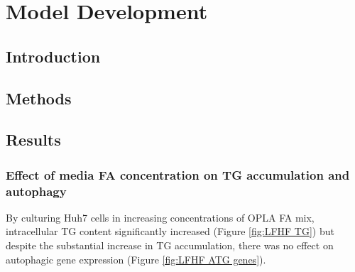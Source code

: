 \chapter{\label{ch:3-Model Development}Model Development}

\minitoc

 \section{Introduction}

 \section{Methods}

 \section{Results}

\subsection{Effect of media FA concentration on TG accumulation and autophagy}

By culturing Huh7 cells in increasing concentrations of OPLA FA mix, intracellular TG content significantly increased (Figure \ref{fig:LFHF TG}) but despite the substantial increase in TG accumulation, there was no effect on autophagic gene expression (Figure \ref{fig:LFHF ATG genes}).

